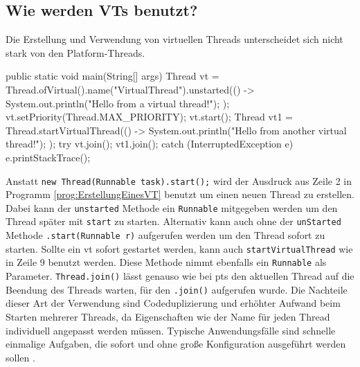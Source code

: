 \subsection{Wie werden VTs benutzt?}
\label{subsec:WieWerdenVTsBenutzt?}

    Die Erstellung und Verwendung von virtuellen Threads unterscheidet sich nicht stark von den Platform-Threads. 
    \begin{program} [H]
        \caption{Erstellung eines \Glspl{vt}}
        \label{prog:ErstellungEinesVT}
    \begin{JavaCode}[language=Java, numbers=left]
public static void main(String[] args) {
    Thread vt = Thread.ofVirtual().name("VirtualThread").unstarted(() -> {
        System.out.println("Hello from a virtual thread!");
    });
    vt.setPriority(Thread.MAX_PRIORITY);
    vt.start();
    Thread vt1 = Thread.startVirtualThread(() -> {
        System.out.println("Hello from another virtual thread!");
    });
    try {
        vt.join(); vt1.join();
    } catch (InterruptedException e) {
        e.printStackTrace();
    }
}\end{JavaCode}
    \end{program}
    Anstatt \texttt{new Thread(Runnable task).start();} wird der Ausdruck aus Zeile 2 in Programm 
    \ref{prog:ErstellungEinesVT} benutzt um einen neuen Thread zu erstellen. Dabei kann der \texttt{unstarted} Methode ein \texttt{Runnable} mitgegeben werden um den Thread später mit \texttt{start} zu starten. Alternativ kann auch ohne der 
    \texttt{unStarted} Methode \texttt{.start(Runnable r)} aufgerufen werden um den Thread sofort zu starten. Sollte ein \gls{vt} sofort gestartet werden, kann auch \texttt{startVirtualThread} wie in Zeile 9 benutzt werden. Diese Methode nimmt ebenfalls ein
    \texttt{Runnable} als Parameter. \texttt{Thread.join()} lässt genauso wie bei \Glspl{pt} den aktuellen Thread 
    auf die Beendung des Threads warten, für den \texttt{.join()} aufgerufen wurde. Die Nachteile dieser Art der Verwendung sind Codeduplizierung und erhöhter Aufwand
    beim Starten mehrerer Threads, da Eigenschaften wie der Name für jeden Thread individuell angepasst werden müssen. Typische Anwendungsfälle sind schnelle
    einmalige Aufgaben, die sofort und ohne große Konfiguration ausgeführt werden sollen \cite{oracle21Thread}.

